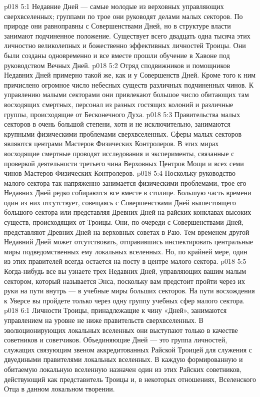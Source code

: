 \vs p018 5:1 Недавние Дней --- самые молодые из верховных управляющих сверхвселенных; группами по трое они руководят делами малых секторов. По природе они равноправны с Совершенствами Дней, но в структуре власти занимают подчиненное положение. Существует всего двадцать одна тысяча этих личностно великолепных и божественно эффективных личностей Троицы. Они были созданы одновременно и все вместе прошли обучение в Хавоне под руководством Вечных Дней.
\vs p018 5:2 Отряд сподвижников и помощников Недавних Дней примерно такой же, как и у Совершенств Дней. Кроме того к ним причислено огромное число небесных существ различных подчиненных чинов. К управлению малыми секторами они привлекают большое число обитающих там восходящих смертных, персонал из разных гостящих колоний и различные группы, происходящие от Бесконечного Духа.
\vs p018 5:3 Правительства малых секторов в очень большой степени, хотя и не исключительно, занимаются крупными физическими проблемами сверхвселенных. Сферы малых секторов являются центрами Мастеров Физических Контролеров. В этих мирах восходящие смертные проводят исследования и эксперименты, связанные с проверкой деятельности третьего чина Верховных Центров Мощи и всех семи чинов Мастеров Физических Контролеров.
\vs p018 5:4 Поскольку руководство малого сектора так напряженно занимается физическими проблемами, трое его Недавних Дней редко собираются все вместе в столице. Большую часть времени один из них отсутствует, совещаясь с Совершенствами Дней вышестоящего большого сектора или представляя Древних Дней на райских конклавах высоких существ, происходящих от Троицы. Они, по очереди с Совершенствами Дней, представляют Древних Дней на верховных советах в Раю. Тем временем другой Недавний Дней может отсутствовать, отправившись инспектировать центральные миры подведомственных ему локальных вселенных. Но, по крайней мере, один из этих правителей всегда остается на посту в центре малого сектора.
\vs p018 5:5 Когда\hyp{}нибудь все вы узнаете трех Недавних Дней, управляющих вашим малым сектором, который называется Энса, поскольку вам предстоит пройти через их руки на пути внутрь --- в учебные миры больших секторов. На пути восхождения к Уверсе вы пройдете только через одну группу учебных сфер малого сектора.
\vs p018 6:1 Личности Троицы, принадлежащие к чину «Дней», занимаются управлением на уровне не ниже правительств сверхвселенных. В эволюционирующих локальных вселенных они выступают только в качестве советников и советчиков. Объединяющие Дней --- это группа личностей, служащих связующим звеном аккредитованных Райской Троицей для служения с двуедиными правителями локальных вселенных. В каждую формированную и обитаемую локальную вселенную назначен один из этих Райских советников, действующий как представитель Троицы и, в некоторых отношениях, Вселенского Отца в данном локальном творении.
